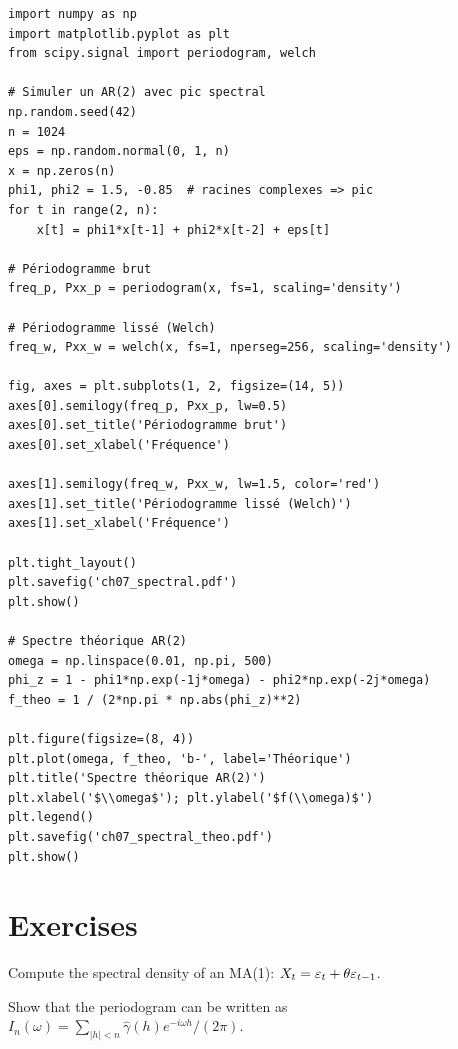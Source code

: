 \begin{codeblock}[title=\textbf{Python}]
\begin{verbatim}
import numpy as np
import matplotlib.pyplot as plt
from scipy.signal import periodogram, welch

# Simuler un AR(2) avec pic spectral
np.random.seed(42)
n = 1024
eps = np.random.normal(0, 1, n)
x = np.zeros(n)
phi1, phi2 = 1.5, -0.85  # racines complexes => pic
for t in range(2, n):
    x[t] = phi1*x[t-1] + phi2*x[t-2] + eps[t]

# Périodogramme brut
freq_p, Pxx_p = periodogram(x, fs=1, scaling='density')

# Périodogramme lissé (Welch)
freq_w, Pxx_w = welch(x, fs=1, nperseg=256, scaling='density')

fig, axes = plt.subplots(1, 2, figsize=(14, 5))
axes[0].semilogy(freq_p, Pxx_p, lw=0.5)
axes[0].set_title('Périodogramme brut')
axes[0].set_xlabel('Fréquence')

axes[1].semilogy(freq_w, Pxx_w, lw=1.5, color='red')
axes[1].set_title('Périodogramme lissé (Welch)')
axes[1].set_xlabel('Fréquence')

plt.tight_layout()
plt.savefig('ch07_spectral.pdf')
plt.show()

# Spectre théorique AR(2)
omega = np.linspace(0.01, np.pi, 500)
phi_z = 1 - phi1*np.exp(-1j*omega) - phi2*np.exp(-2j*omega)
f_theo = 1 / (2*np.pi * np.abs(phi_z)**2)

plt.figure(figsize=(8, 4))
plt.plot(omega, f_theo, 'b-', label='Théorique')
plt.title('Spectre théorique AR(2)')
plt.xlabel('$\\omega$'); plt.ylabel('$f(\\omega)$')
plt.legend()
plt.savefig('ch07_spectral_theo.pdf')
plt.show()
\end{verbatim}
\end{codeblock}

\section{Exercises}

\begin{exercise}[$\star$]
Compute the spectral density of an MA(1): $X_t=\varepsilon_t+\theta\varepsilon_{t-1}$.
\end{exercise}

\begin{exercise}[$\star\star$]
Show that the periodogram can be written as $I_n(\omega)=\sum_{|h|<n}\hat\gamma(h)e^{-i\omega h}/(2\pi)$.
\end{exercise}

